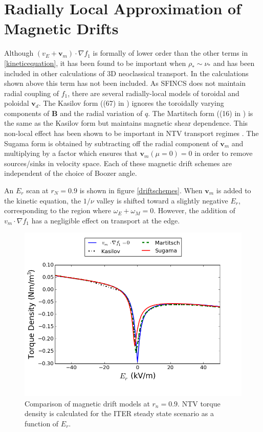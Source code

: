 \documentclass{article}
\begin{document}
\FloatBarrier

\section{Radially Local Approximation of Magnetic Drifts}
Although $(v_E + \bm{v}_m) \cdot \nabla f_1$ is formally of lower order than the other terms in \ref{kineticequation}, it has been found to be important when $\rho_* \sim \nu_*$ and has been included in other calculations of 3D neoclassical transport. In the calculations shown above this term has not been included. 
 As SFINCS does not maintain radial coupling of $f_1$, there are several radially-local models of toroidal and poloidal $\bm{v}_d$.  The Kasilov form ((67) in \cite{Kasilov2014}) ignores the toroidally varying components of $\bm{B}$ and the radial variation of $q$. The Martitsch form ((16) in \cite{Martitsch2016}) is the same as the Kasilov form but maintains magnetic shear dependence. This non-local effect has been shown to be important in NTV transport regimes \cite{Martitsch2016}. The Sugama form is obtained by subtracting off the radial component of $\bm{v}_m$ and multiplying by a factor which ensures that $\bm{v}_m (\mu = 0)  = 0$ in order to remove sources/sinks in velocity space. Each of these magnetic drift schemes are independent of the choice of Boozer angle. 

An $E_r$ scan at $r_N = 0.9$ is shown in figure \ref{driftschemes}. When $\bm{v}_m$ is added to the kinetic equation, the $1/\nu$ valley is shifted toward a slightly negative $E_r$, corresponding to the region where $\omega_E + \omega_M = 0$. However, the addition of $v_m \cdot \nabla f_1$ has a negligible effect on transport at the edge. 

\begin{figure}[h!]
\centering
\includegraphics[width=1\textwidth]{mdscomparison.png}
\caption{Comparison of magnetic drift models at $r_n = 0.9$. NTV torque density is calculated for the ITER steady state scenario as a function of $E_r$. }
\end{figure}\label{driftschemes}



\end{document}
